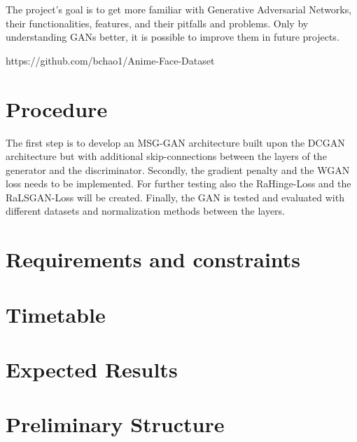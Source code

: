 \documentclass[conference,onecolumn,compsoc]{IEEEtran}
\begin{document}
\noindent
The project's goal is to get more familiar with Generative Adversarial 
Networks, their functionalities, features, and their pitfalls and problems. 
Only by understanding GANs better, it is possible to improve them in future 
projects.

https://github.com/bchao1/Anime-Face-Dataset


\section{Procedure}

\noindent
The first step is to develop an MSG-GAN \cite{karnewar2020msggan} architecture 
built upon the DCGAN \cite{radford2016unsupervised} architecture but with 
additional skip-connections between the layers of the generator and the 
discriminator. Secondly, the gradient penalty and the WGAN loss needs to be 
implemented. For further testing also the RaHinge-Loss and the RaLSGAN-Loss 
will be created. Finally, the GAN is tested and evaluated with different
datasets and normalization methods between the layers.

\section{Requirements and constraints}

\blindtext

\section{Timetable}

\noindent
\blindtext \cite{yazıcı2019unusual}

\section{Expected Results}

\noindent
\blindtext


\section{Preliminary  Structure}
\end{document}
